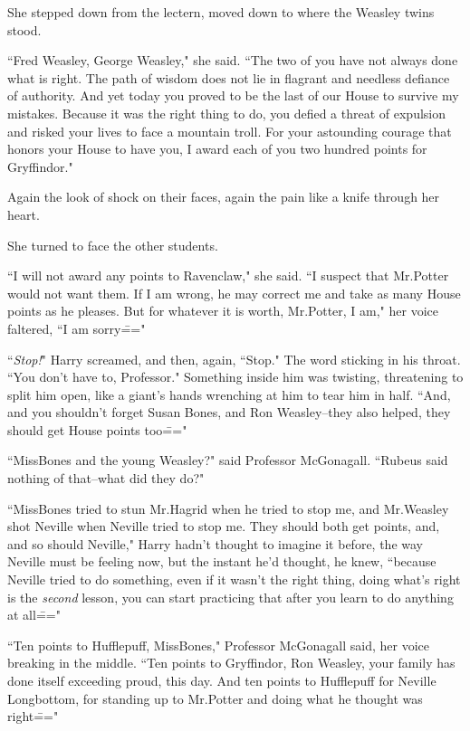 She stepped down from the lectern, moved down to where the Weasley twins stood.

``Fred Weasley, George Weasley," she said. ``The two of you have not always done what is right. The path of wisdom does not lie in flagrant and needless defiance of authority. And yet today you proved to be the last of our House to survive my mistakes. Because it was the right thing to do, you defied a threat of expulsion and risked your lives to face a mountain troll. For your astounding courage that honors your House to have you, I award each of you two hundred points for Gryffindor."

Again the look of shock on their faces, again the pain like a knife through her heart.

She turned to face the other students.

``I will not award any points to Ravenclaw," she said. ``I suspect that Mr.\?Potter would not want them. If I am wrong, he may correct me and take as many House points as he pleases. But for whatever it is worth, Mr.\?Potter, I am," her voice faltered, ``I am sorry\==="

\later

``\emph{Stop!}" Harry screamed, and then, again, ``Stop." The word sticking in his throat. ``You don't have to, Professor." Something inside him was twisting, threatening to split him open, like a giant's hands wrenching at him to tear him in half. ``And, and you shouldn't forget Susan Bones, and Ron Weasley\---they also helped, they should get House points too\==="

``Miss\?Bones and the young Weasley?" said Professor McGonagall. ``Rubeus said nothing of that\---what did they do?"

``Miss\?Bones tried to stun Mr.\?Hagrid when he tried to stop me, and Mr.\?Weasley shot Neville when Neville tried to stop me. They should both get points, and, and so should Neville," Harry hadn't thought to imagine it before, the way Neville must be feeling now, but the instant he'd thought, he knew, ``because Neville tried to do something, even if it wasn't the right thing, doing what's right is the \emph{second} lesson, you can start practicing that after you learn to do anything at all\==="

``Ten points to Hufflepuff, Miss\?Bones," Professor McGonagall said, her voice breaking in the middle. ``Ten points to Gryffindor, Ron Weasley, your family has done itself exceeding proud, this day. And ten points to Hufflepuff for Neville Longbottom, for standing up to Mr.\?Potter and doing what he thought was right\==="


